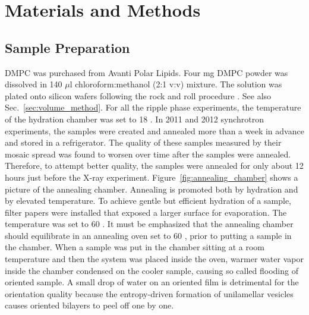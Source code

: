 \newpage
\section{Materials and Methods}
\subsection{Sample Preparation}
DMPC was purchased from Avanti Polar Lipids.
Four mg DMPC powder was dissolved in 140 $\mu$l chloroform:methanol (2:1 v:v) 
mixture. The solution was plated onto silicon wafers following the rock and
roll procedure \cite{Tristram-Nagle07_MMB}. 
See also Sec.~\ref{sec:volume_method}.
For all the ripple phase experiments, the temperature of the hydration 
chamber was set to 18 \textcelsius. 
In 2011 and 2012 synchrotron experiments, the samples were created and annealed 
more than a week in advance and stored in a refrigerator. The quality of 
these samples measured by their mosaic spread was found to worsen over time
after the samples were annealed. Therefore, to attempt better quality, the 
samples were annealed for only about 12 hours just before the X-ray experiment.
Figure~\ref{fig:annealing_chamber} shows a picture of the annealing chamber.
Annealing is promoted both by hydration and by elevated temperature. 
To achieve gentle but efficient hydration of a sample, filter papers were installed
that exposed a larger surface for evaporation. The temperature was set to
60 \textcelsius.
It must be emphasized that the annealing 
chamber should equilibrate in an annealing oven set to 60 \textcelsius,
prior to putting a sample in the chamber.
When a sample was put in the chamber sitting at a room temperature and
then the system was placed inside the oven, warmer water vapor inside the chamber 
condensed on the cooler sample, causing so called flooding of oriented sample. 
A small drop of water on an oriented film is detrimental for the orientation quality because the
entropy-driven formation of unilamellar vesicles causes oriented bilayers to peel off
one by one. 

